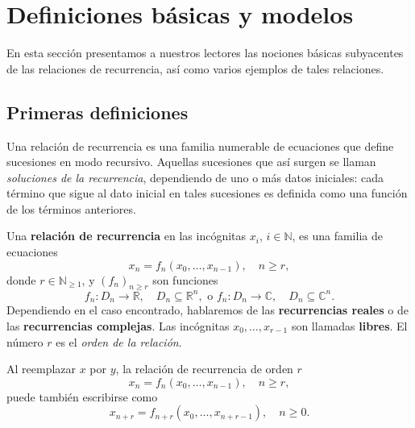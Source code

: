 \section{Definiciones básicas y modelos}

En esta sección presentamos a nuestros lectores las nociones básicas subyacentes de las relaciones de recurrencia, así como varios ejemplos de tales relaciones.

\subsection{Primeras definiciones}

Una relación de recurrencia es una familia numerable de ecuaciones que define sucesiones en modo recursivo. Aquellas sucesiones que así surgen se llaman \emph{soluciones de la recurrencia}, dependiendo de uno o más datos iniciales: cada término que sigue al dato inicial en tales sucesiones es definida como una función de los términos anteriores.

\begin{definition}
	Una \textbf{relación de recurrencia} en las incógnitas $x_{i}$, $i\in\mathds{N}$, es una familia de ecuaciones
		\begin{equation*}
			x_{n}=f_{n}\left(x_{0},\ldots,x_{n-1}\right),\quad n\geq r,
		\end{equation*}
	donde $r\in\mathds{N}_{\geq1}$, y ${\left(f_{n}\right)}_{n\geq r}$ son funciones
		\begin{equation*}
			f_{n}\colon D_{n}\rightarrow\mathds{R},\quad D_{n}\subseteq\mathds{R}^{n},\text{ o }f_{n}\colon D_{n}\rightarrow\mathds{C},\quad D_{n}\subseteq\mathds{C}^{n}.
		\end{equation*}
	Dependiendo en el caso encontrado, hablaremos de las \textbf{recurrencias reales} o de las \textbf{recurrencias complejas}. Las incógnitas $x_{0},\ldots,x_{r-1}$ son llamadas \textbf{libres}. El número $r$ es el \emph{orden de la relación}.

	Al reemplazar $x$ por $y$, la relación de recurrencia de orden $r$
		\begin{equation*}
			x_{n}=f_{n}\left(x_{0},\ldots,x_{n-1}\right),\quad n\geq r,
		\end{equation*}
	puede también escribirse como
		\begin{equation*}
			x_{n+r}=f_{n+r}\left(x_{0},\ldots,x_{n+r-1}\right),\quad n\geq0.
		\end{equation*}
\end{definition}

